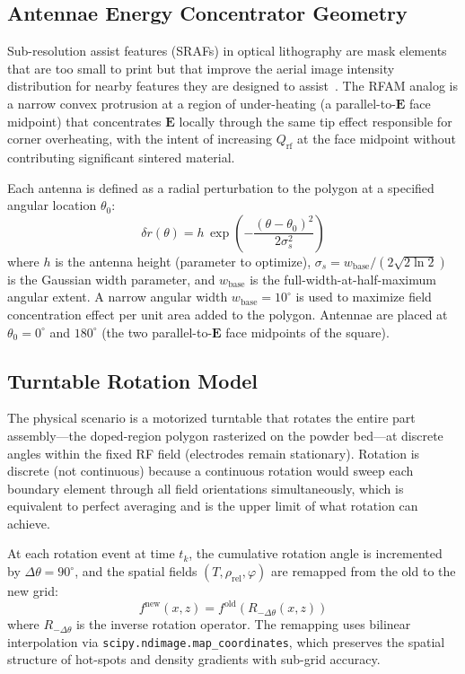 \documentclass[5p,times]{elsarticle}
\newcommand{\Qrf}{Q_{\mathrm{rf}}}
\newcommand{\rhorel}{\rho_{\mathrm{rel}}}
\newcommand{\phimelt}{\varphi}
\newcommand{\vect}[1]{\boldsymbol{#1}}
\begin{document}
\subsection{Antennae Energy Concentrator Geometry}
\label{sec:spike_method}

Sub-resolution assist features (SRAFs) in optical lithography are mask
elements that are too small to print but that improve the aerial image
intensity distribution for nearby features they are designed to
assist~\cite{pang2021inverse}.  The RFAM analog is a narrow convex
protrusion at a region of under-heating (a parallel-to-$\vect{E}$ face
midpoint) that concentrates $\vect{E}$ locally through the same tip
effect responsible for corner overheating, with the intent of
increasing $\Qrf$ at the face midpoint without contributing significant
sintered material.

Each antenna is defined as a radial perturbation to the polygon at a
specified angular location $\theta_0$:
\begin{equation}
  \delta r(\theta) = h\,\exp\!\!\left(-\frac{(\theta-\theta_0)^2}{2\sigma_s^2}\right)
  \label{eq:spike_profile}
\end{equation}
where $h$ is the antenna height (parameter to optimize),
$\sigma_s = w_{\mathrm{base}} / (2\sqrt{2\ln 2})$ is the Gaussian
width parameter, and $w_{\mathrm{base}}$ is the full-width-at-half-maximum
angular extent.  A narrow angular width $w_{\mathrm{base}} = 10^\circ$
is used to maximize field concentration effect per unit area added to
the polygon.  Antennae are placed at $\theta_0 = 0^\circ$ and
$180^\circ$ (the two parallel-to-$\vect{E}$ face midpoints of the
square).

\subsection{Turntable Rotation Model}
\label{sec:turntable_method}

The physical scenario is a motorized turntable that rotates the entire
part assembly---the doped-region polygon rasterized on the powder
bed---at discrete angles within the fixed RF field (electrodes remain
stationary).  Rotation is discrete (not continuous) because a
continuous rotation would sweep each boundary element through all
field orientations simultaneously, which is equivalent to perfect
averaging and is the upper limit of what rotation can achieve.

At each rotation event at time $t_k$, the cumulative rotation angle
is incremented by $\Delta\theta = 90^\circ$, and the spatial fields
$(T, \rhorel, \phimelt)$ are remapped from the old to the new grid:
\begin{equation}
  f^{\mathrm{new}}(x, z) = f^{\mathrm{old}}(R_{-\Delta\theta}(x,z))
  \label{eq:rotation_remap}
\end{equation}
where $R_{-\Delta\theta}$ is the inverse rotation operator.  The
remapping uses bilinear interpolation via
\texttt{scipy.ndimage.map\_coordinates}, which preserves the spatial
structure of hot-spots and density gradients with sub-grid accuracy.
\end{document}
